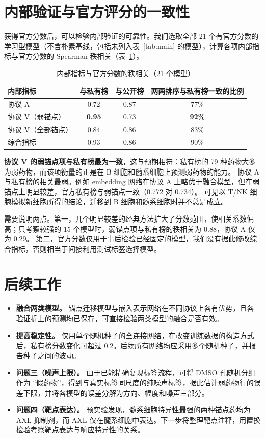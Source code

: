 \documentclass[11pt,a4paper]{article}
\begin{document}
\section{内部验证与官方评分的一致性}

获得官方分数后，可以检验内部验证的可靠性。我们选取全部 21 个有官方分数的学习型模型（不含朴素基线，包括未列入表~\ref{tab:main} 的模型），计算各项内部指标与官方分数的 Spearman 秩相关（表~\ref{tab:corr}）。

\begin{table}[!ht]
\centering\small
\caption{内部指标与官方分数的秩相关（21 个模型）}\label{tab:corr}
\begin{tabular}{@{}lccc@{}}
\toprule
内部指标 & 与私有榜 & 与公开榜 & 两两排序与私有榜一致的比例 \\
\midrule
协议 A & 0.72 & 0.87 & 77\% \\
协议 V（弱锚点） & \textbf{0.95} & 0.73 & \textbf{92\%} \\
协议 V（全部锚点） & 0.84 & 0.86 & 83\% \\
综合指标 & 0.93 & 0.86 & 90\% \\
\bottomrule
\end{tabular}
\end{table}

\textbf{协议 V 的弱锚点项与私有榜最为一致}，这与预期相符：私有榜的 79 种药物大多为弱药物，而该项衡量的正是在 B 细胞和髓系细胞上预测弱药物的能力。
协议 A 与私有榜的相关最弱。例如 embedding 网络在协议 A 上略优于融合模型，但在弱锚点上明显较差，官方私有榜与弱锚点一致（0.772 对 0.734）。
可见以 T/NK 细胞模拟新细胞所得的结论，迁移到 B 细胞和髓系细胞时并不总是成立。

需要说明两点。第一，几个明显较差的经典方法扩大了分数范围，使相关系数偏高；只考察较强的 15 个模型时，弱锚点项与私有榜的秩相关为 0.88，协议 A 仅为 0.29。
第二，官方分数仅用于事后检验已经固定的模型，我们没有据此修改综合指标，否则相当于间接利用测试标签选择模型。

\section{后续工作}

\begin{itemize}
\item \textbf{融合两类模型。} 锚点迁移模型与嵌入表示网络在不同协议上各有优势，且各验证折上的预测均已保存，可直接检验两类模型的融合是否有效。
\item \textbf{提高稳定性。} 仅用单个随机种子的全连接网络，在改变训练数据的构造方式后，私有榜分数变化可超过 0.2。后续所有网络均应采用多个随机种子，并报告种子之间的波动。
\item \textbf{问题三（噪声上限）。} 由于已能精确复现标签流程，可将 DMSO 孔随机分组作为 ``假药物''，得到与真实标签同尺度的纯噪声标签，据此估计弱药物行的误差下限，并将各模型的误差分解为方向、幅度和噪声三部分。
\item \textbf{问题四（靶点表达）。} 预实验发现，髓系细胞特异性最强的两种锚点药均为 AXL 抑制剂，而 AXL 仅在髓系细胞中表达。下一步将整理靶点注释，用置换检验考察靶点表达与响应特异性的关系。
\end{itemize}
\end{document}
